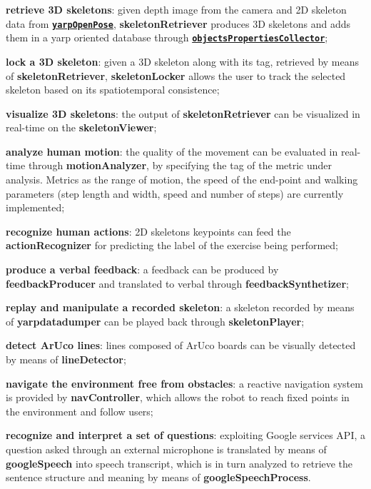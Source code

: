 \begin{DoxyItemize}
\item {\bfseries retrieve 3D skeletons}\+: given depth image from the camera and 2D skeleton data from \href{https://github.com/robotology/human-sensing}{\tt {\bfseries {\ttfamily yarp\+Open\+Pose}}}, {\bfseries {\ttfamily skeleton\+Retriever}} produces 3D skeletons and adds them in a yarp oriented database through \href{http://www.icub.org/doc/icub-main/group__objectsPropertiesCollector.html}{\tt {\bfseries {\ttfamily objects\+Properties\+Collector}}};
\item {\bfseries lock a 3D skeleton}\+: given a 3D skeleton along with its tag, retrieved by means of {\bfseries {\ttfamily skeleton\+Retriever}}, {\bfseries {\ttfamily skeleton\+Locker}} allows the user to track the selected skeleton based on its spatiotemporal consistence;
\item {\bfseries visualize 3D skeletons}\+: the output of {\bfseries {\ttfamily skeleton\+Retriever}} can be visualized in real-\/time on the {\bfseries {\ttfamily skeleton\+Viewer}};
\item {\bfseries analyze human motion}\+: the quality of the movement can be evaluated in real-\/time through {\bfseries {\ttfamily motion\+Analyzer}}, by specifying the tag of the metric under analysis. Metrics as the range of motion, the speed of the end-\/point and walking parameters (step length and width, speed and number of steps) are currently implemented;
\item {\bfseries recognize human actions}\+: 2D skeleton\textquotesingle{}s keypoints can feed the {\bfseries {\ttfamily action\+Recognizer}} for predicting the label of the exercise being performed;
\item {\bfseries produce a verbal feedback}\+: a feedback can be produced by {\bfseries {\ttfamily feedback\+Producer}} and translated to verbal through {\bfseries {\ttfamily feedback\+Synthetizer}};
\item {\bfseries replay and manipulate a recorded skeleton}\+: a skeleton recorded by means of {\bfseries {\ttfamily yarpdatadumper}} can be played back through {\bfseries {\ttfamily skeleton\+Player}};
\item {\bfseries detect Ar\+Uco lines}\+: lines composed of Ar\+Uco boards can be visually detected by means of {\bfseries {\ttfamily line\+Detector}};
\item {\bfseries navigate the environment free from obstacles}\+: a reactive navigation system is provided by {\bfseries {\ttfamily nav\+Controller}}, which allows the robot to reach fixed points in the environment and follow users;
\item {\bfseries recognize and interpret a set of questions}\+: exploiting Google services A\+PI, a question asked through an external microphone is translated by means of {\bfseries {\ttfamily google\+Speech}} into speech transcript, which is in turn analyzed to retrieve the sentence structure and meaning by means of {\bfseries {\ttfamily google\+Speech\+Process}}.
\end{DoxyItemize}

